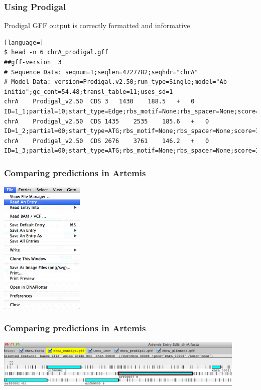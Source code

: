 \begin{frame}[fragile]
  \frametitle{Using Prodigal}
  Prodigal GFF output is correctly formatted and informative
\begin{lstlisting}[language=]
$ head -n 6 chrA_prodigal.gff 
##gff-version  3
# Sequence Data: seqnum=1;seqlen=4727782;seqhdr="chrA"
# Model Data: version=Prodigal.v2.50;run_type=Single;model="Ab initio";gc_cont=54.48;transl_table=11;uses_sd=1
chrA	Prodigal_v2.50	CDS	3	1430	188.5	+	0	ID=1_1;partial=10;start_type=Edge;rbs_motif=None;rbs_spacer=None;score=188.54;cscore=185.37;sscore=3.18;rscore=0.00;uscore=3.18;tscore=0.00
chrA	Prodigal_v2.50	CDS	1435	2535	185.6	+	0	ID=1_2;partial=00;start_type=ATG;rbs_motif=None;rbs_spacer=None;score=185.61;cscore=184.24;sscore=1.36;rscore=-7.73;uscore=3.48;tscore=4.37
chrA	Prodigal_v2.50	CDS	2676	3761	146.2	+	0	ID=1_3;partial=00;start_type=ATG;rbs_motif=None;rbs_spacer=None;score=146.19;cscore=149.82;sscore=-3.63;rscore=-7.73;uscore=-0.28;tscore=4.37
\end{lstlisting}
\end{frame}

\begin{frame}
  \frametitle{Comparing predictions in Artemis}
  \begin{center}
    \includegraphics[width=0.3\textwidth]{images/artemis_cdspred0}     
    \end{center}
\end{frame}

\begin{frame}
  \frametitle{Comparing predictions in Artemis}
  \begin{center}
    \includegraphics[width=0.9\textwidth]{images/artemis_cdspred1}     
  \end{center}
\end{frame}

